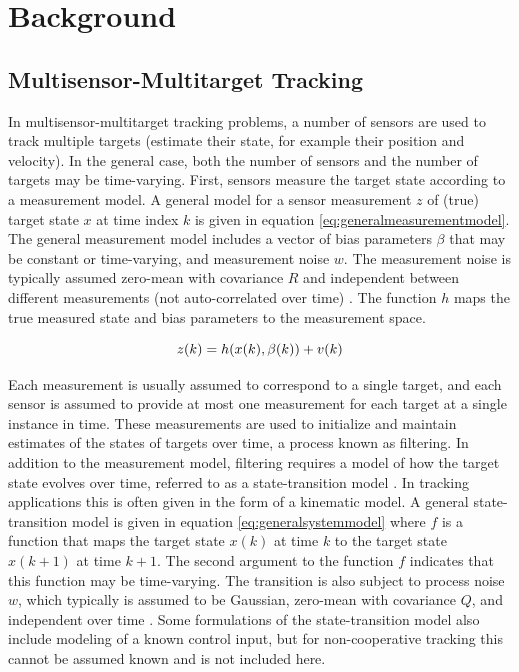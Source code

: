 \documentclass[journal]{IEEEtran}
\begin{document}
\section{Background} \label{background}

\subsection{Multisensor-Multitarget Tracking}
In multisensor-multitarget tracking problems, a number of sensors are used to track multiple targets (estimate their state, for example their position and velocity). In the general case, both the number of sensors and the number of targets may be time-varying. First, sensors measure the target state according to a measurement model. A general model for a sensor measurement $z$ of (true) target state $x$ at time index $k$ is given in equation \ref{eq:generalmeasurementmodel}. The general measurement model includes a vector of bias parameters $\beta$ that may be constant or time-varying, and measurement noise $w$. The measurement noise is typically assumed zero-mean with covariance $R$ and independent between different measurements (not auto-correlated over time) \cite{bar2004estimation}. The function $h$ maps the true measured state and bias parameters to the measurement space.

\begin{equation}
    z(k) = h(x(k), \beta(k)) + v(k) \\
\label{eq:generalmeasurementmodel}
\end{equation}

Each measurement is usually assumed to correspond to a single target, and each sensor is assumed to provide at most one measurement for each target at a single instance in time. These measurements are used to initialize and maintain estimates of the states of targets over time, a process known as filtering. In addition to the measurement model, filtering requires a model of how the target state evolves over time, referred to as a state-transition model \cite{bar2004estimation}. In tracking applications this is often given in the form of a kinematic model. A general state-transition model is given in equation \ref{eq:generalsystemmodel} where $f$ is a function that maps the target state $x(k)$ at time $k$ to the target state $x(k+1)$ at time $k+1$. The second argument to the function $f$ indicates that this function may be time-varying. The transition is also subject to process noise $w$, which typically is assumed to be Gaussian, zero-mean with covariance $Q$, and independent over time \cite{bar2004estimation}. Some formulations of the state-transition model also include modeling of a known control input, but for non-cooperative tracking this cannot be assumed known and is not included here.
\end{document}
